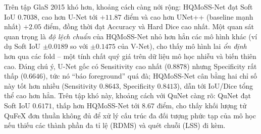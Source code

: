 \begin{table}[h]
\centering
\caption{Kết quả trên GlaS 2015 -- các độ đo phân loại điểm ảnh (trung bình $\pm$ độ lệch chuẩn, $5$-fold).}
\label{tab:glas_pixel}
\end{table}

Trên tập GlaS 2015 khó hơn, khoảng cách càng nới rộng: HQMoSS-Net đạt Soft IoU $0.7038$, cao hơn U-Net tới $+11.87$ điểm và cao hơn UNet++ (baseline mạnh nhất) $+2.05$ điểm, đồng thời đạt Accuracy và Hard Dice cao nhất. Một quan sát quan trọng là \emph{độ lệch chuẩn} của HQMoSS-Net nhỏ hơn hẳn các mô hình khác (ví dụ Soft IoU $\pm 0.0189$ so với $\pm 0.1475$ của V-Net), cho thấy mô hình lai \emph{ổn định} hơn qua các fold -- một tính chất quý giá trên dữ liệu mô học nhiễu và biến thiên cao. Đáng chú ý, U-Net gốc có Sensitivity cao nhất ($0.8878$) nhưng Specificity rất thấp ($0.6646$), tức nó ``báo foreground'' quá đà; HQMoSS-Net cân bằng hai chỉ số này tốt hơn nhiều (Sensitivity $0.8643$, Specificity $0.8413$), dẫn tới IoU/Dice tổng thể cao hơn hẳn. Trên tập khó này, khoảng cách với QuNet càng rõ: QuNet đạt Soft IoU $0.6171$, thấp hơn HQMoSS-Net tới $8.67$ điểm, cho thấy khối lượng tử QuFeX đơn thuần không đủ để xử lý cấu trúc đa đối tượng phức tạp của mô học nếu thiếu các thành phần đa tỉ lệ (RDMS) và quét chuỗi (LSS) đi kèm.

